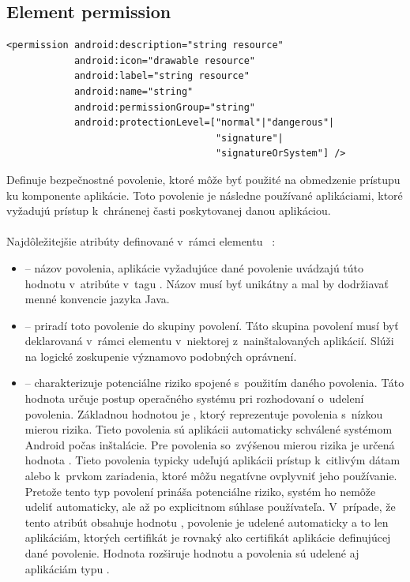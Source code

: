\subsection{Element permission}
\lstset{language=XML}
\begin{lstlisting}
<permission android:description="string resource"
            android:icon="drawable resource"
            android:label="string resource"
            android:name="string"
            android:permissionGroup="string"
            android:protectionLevel=["normal"|"dangerous"| 
                                     "signature"|
                                     "signatureOrSystem"] />
\end{lstlisting}
Definuje bezpečnostné povolenie, ktoré môže byť použité na obmedzenie prístupu ku komponente aplikácie. Toto povolenie je následne používané aplikáciami, ktoré vyžadujú prístup k~chránenej časti poskytovanej danou aplikáciou.\\\\ Najdôležitejšie atribúty definované v~rámci elementu ~\cite{elPerm}:\\
\begin{itemize}
\item {} -- názov povolenia, aplikácie vyžadujúce dané povolenie uvádzajú túto hodnotu v~atribúte  v~tagu . Názov musí byť unikátny a mal by dodržiavať menné konvencie jazyka Java.
\item {} -- priradí toto povolenie do skupiny povolení. Táto skupina povolení musí byť deklarovaná v~rámci elementu  v~niektorej z~nainštalovaných aplikácií. Slúži na logické zoskupenie významovo podobných oprávnení.
\item {} -- charakterizuje potenciálne riziko spojené s~použitím daného povolenia. Táto hodnota určuje postup operačného systému pri rozhodovaní o~udelení povolenia. 
Základnou hodnotou je , ktorý reprezentuje povolenia s~nízkou mierou rizika. Tieto povolenia sú aplikácii automaticky schválené systémom Android počas inštalácie. Pre povolenia so~zvýšenou mierou rizika je určená hodnota . Tieto povolenia typicky udeľujú aplikácii prístup k~citlivým dátam alebo k~prvkom zariadenia, ktoré môžu negatívne ovplyvniť jeho používanie. Pretože tento typ povolení prináša potenciálne riziko, systém ho nemôže udeliť automaticky, ale až po explicitnom súhlase používateľa.
V~prípade, že tento atribút obsahuje hodnotu , povolenie je udelené automaticky a to len aplikáciám, ktorých certifikát je rovnaký ako certifikát aplikácie definujúcej dané povolenie.   
Hodnota  rozširuje hodnotu  a povolenia sú udelené aj aplikáciám typu .
\end{itemize}

